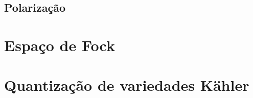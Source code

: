 \subsection{Polarização}

\section{Espaço de Fock}

\section{Quantização de variedades Kähler}

\fi

\printbibliography


